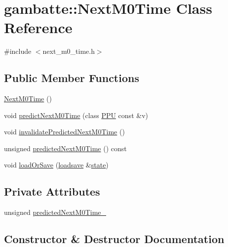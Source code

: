 \hypertarget{classgambatte_1_1NextM0Time}{}\section{gambatte\+:\+:Next\+M0\+Time Class Reference}
\label{classgambatte_1_1NextM0Time}


{\ttfamily \#include $<$next\+\_\+m0\+\_\+time.\+h$>$}

\subsection*{Public Member Functions}
\begin{DoxyCompactItemize}
\item 
\hyperlink{classgambatte_1_1NextM0Time_a0b0c1ec8902b1a108f70ddef805e6b3d}{Next\+M0\+Time} ()
\item 
void \hyperlink{classgambatte_1_1NextM0Time_afcfab2f5281e94db443bd07981720092}{predict\+Next\+M0\+Time} (class \hyperlink{classgambatte_1_1PPU}{P\+PU} const \&v)
\item 
void \hyperlink{classgambatte_1_1NextM0Time_ac43a95dccad6a368419308a78e9f61a5}{invalidate\+Predicted\+Next\+M0\+Time} ()
\item 
unsigned \hyperlink{classgambatte_1_1NextM0Time_a6eab539b211eeb7c88fb0b72ca10e079}{predicted\+Next\+M0\+Time} () const
\item 
void \hyperlink{classgambatte_1_1NextM0Time_a6f94512bb082af935c4b381fc6d16c93}{load\+Or\+Save} (\hyperlink{classgambatte_1_1loadsave}{loadsave} \&\hyperlink{ppu_8cpp_a2f2eca6997ee7baf8901725ae074d45b}{state})
\end{DoxyCompactItemize}
\subsection*{Private Attributes}
\begin{DoxyCompactItemize}
\item 
unsigned \hyperlink{classgambatte_1_1NextM0Time_ac193efbcd78f7c6c44eba906eecc3abe}{predicted\+Next\+M0\+Time\+\_\+}
\end{DoxyCompactItemize}


\subsection{Constructor \& Destructor Documentation}
\mbox{\label{classgambatte_1_1NextM0Time_a0b0c1ec8902b1a108f70ddef805e6b3d}} 
